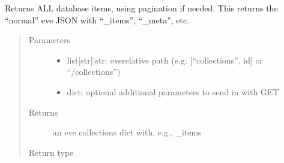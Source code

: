 \documentclass[letterpaper,10pt,english]{sphinxmanual}
\begin{document}

\begin{fulllineitems}
\label{\detokenize{autoapi/pine/backend/data/service/index:pine.backend.data.service.get_all}}
\sphinxAtStartPar
Returns ALL database items, using pagination if needed.  This returns the “normal” eve
JSON with “\_items”, “\_meta”, etc.
\begin{quote}\begin{description}
\item[{Parameters}] \leavevmode\begin{itemize}
\item {} 
\sphinxAtStartPar
{} \textendash{} list{[}str{]}|str: eve\sphinxhyphen{}relative path (e.g. {[}“collections”, id{]} or “/collections”)

\item {} 
\sphinxAtStartPar
{} \textendash{} dict: optional additional parameters to send in with GET

\end{itemize}

\item[{Returns}] \leavevmode
\sphinxAtStartPar
an eve collections dict with, e.g., \_items

\item[{Return type}] \leavevmode
\sphinxAtStartPar
{}

\end{description}\end{quote}

\end{fulllineitems}

\end{document}
